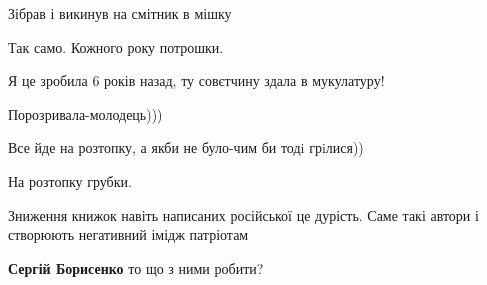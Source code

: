 \begin{itemize}
Зібрав і викинув на смітник в мішку

 
Так само. Кожного року потрошки.

 
Я це зробила 6 років назад, ту совєтчину здала в мукулатуру!

 
Порозривала-молодець)))

 
Все йде на розтопку, а якби не було-чим би тодi грiлися))

 
На розтопку грубки.


Зниження книжок навіть написаних російської це дурість. Саме такі автори і
створюють негативний імідж патріотам

\begin{itemize}
 
\textbf{Сергій Борисенко} то що з ними робити?


\end{itemize}
\end{itemize}
